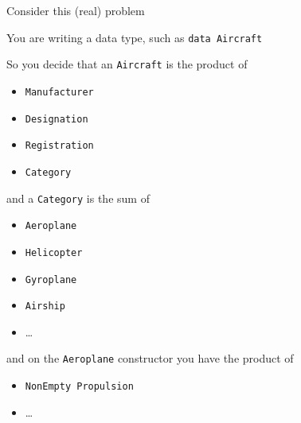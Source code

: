 \begin{frame}
\begin{center}
Consider this (real) problem
\end{center}
\end{frame}

\begin{frame}
\begin{center}
You are writing a data type, such as \lstinline{data Aircraft}
\end{center}
\end{frame}

\begin{frame}
\begin{center}
So you decide that an \lstinline{Aircraft} is the product of
\end{center}
\begin{itemize}
\item \lstinline{Manufacturer}
\item \lstinline{Designation}
\item \lstinline{Registration}
\item \lstinline{Category}
\end{itemize}
\end{frame}

\begin{frame}
\begin{center}
and a \lstinline{Category} is the sum of
\end{center}
\begin{itemize}
\item \lstinline{Aeroplane}
\item \lstinline{Helicopter}
\item \lstinline{Gyroplane}
\item \lstinline{Airship}
\item \ldots
\end{itemize}
\end{frame}

\begin{frame}
\begin{center}
and on the \lstinline{Aeroplane} constructor you have the product of
\end{center}
\begin{itemize}
\item \lstinline{NonEmpty Propulsion}
\item \ldots
\end{itemize}
\end{frame}

